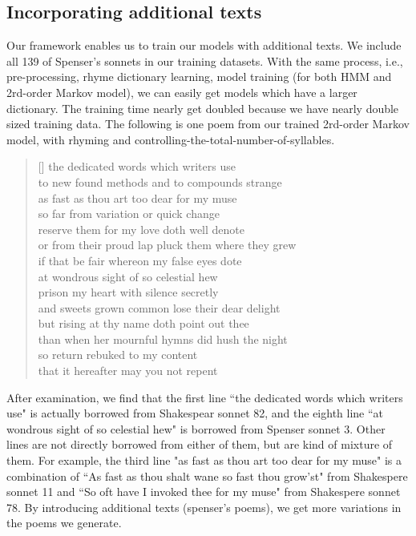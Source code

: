 \subsection{Incorporating additional texts} \label{sec:additionaltext}
Our framework enables us to train our models with additional texts. We include all 139 of Spenser's sonnets in our training datasets. With the same process, i.e., pre-processing, rhyme dictionary learning, model training (for both HMM and 2rd-order Markov model), we can easily get models which have a larger dictionary. The training time nearly get doubled because we have nearly double sized training data. The following is one poem from our trained 2rd-order Markov model, with rhyming and controlling-the-total-number-of-syllables.
\settowidth{\versewidth}{even  see  shall  accessary  used  must  find  and  herself  enfeebled  mine  it}
\begin{verse}[\versewidth]
 the  dedicated  words  which  writers  use \\
 to  new  found  methods  and  to  compounds  strange \\
 as  fast  as  thou  art  too  dear  for  my  muse \\
 so  far  from  variation  or  quick  change \\
 reserve  them  for  my  love  doth  well  denote \\
 or  from  their  proud  lap  pluck  them  where  they  grew \\
 if  that  be  fair  whereon  my  false  eyes  dote \\
 at  wondrous  sight  of  so  celestial  hew \\
 prison  my  heart  with  silence  secretly \\
 and  sweets  grown  common  lose  their  dear  delight \\
 but  rising  at  thy  name  doth  point  out  thee \\
 than  when  her  mournful  hymns  did  hush  the  night \\
 \vin so  return  rebuked  to  my  content \\
 \vin that  it  hereafter  may  you  not  repent
\end{verse}

After examination, we find that the first line ``the  dedicated  words  which  writers  use" is actually borrowed from Shakespear sonnet 82, and the eighth line ``at  wondrous  sight  of  so  celestial  hew" is borrowed from Spenser sonnet 3. Other lines are not directly borrowed from either of them, but are kind of mixture of them. For example, the third line "as  fast  as  thou  art  too  dear  for  my  muse" is a combination of  ``As fast as thou shalt wane so fast thou grow'st" from Shakespere sonnet 11 and ``So oft have I invoked thee for my muse" from Shakespere sonnet 78. By introducing additional texts (spenser's poems), we get more variations in the poems we generate.



